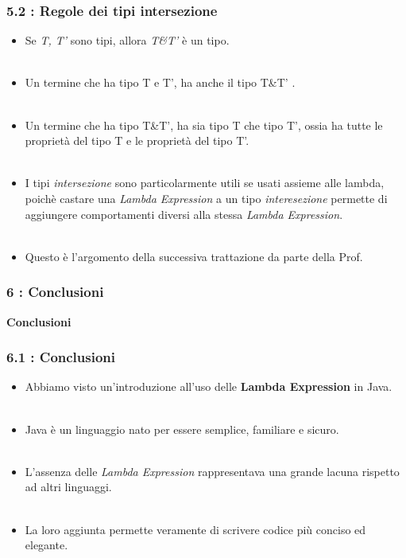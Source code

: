 \documentclass{beamer}
\begin{document}

\begin{frame}
	\frametitle{\textbf{5.2 : Regole dei tipi intersezione}}
		\begin{itemize}
		\item
			Se \textit{T, T'} sono tipi, allora \textit{T\&T'} è un tipo.\\\
		\item
			Un termine che ha tipo T e T', ha anche il tipo T\&T' .\\\
		\item
			Un termine che ha tipo T\&T', ha sia tipo T che tipo T', ossia ha tutte le proprietà del tipo T e le proprietà del tipo T'.\\\
		\item
			I tipi \textit{intersezione} sono particolarmente utili se usati assieme alle lambda, poichè castare una \textit{Lambda Expression} a un tipo \textit{interesezione} permette di aggiungere comportamenti diversi alla stessa \textit{Lambda Expression}.\\\
		\item
			Questo è l'argomento della successiva trattazione da parte della Prof.
	\end{itemize}
\end{frame}


\begin{frame}
	\frametitle{\textbf{6 : Conclusioni}}
	\begin{center}
		\textbf{\Huge Conclusioni}
	\end{center}
\end{frame}


\begin{frame}
	\frametitle{\textbf{6.1 : Conclusioni}}
	\begin{itemize}
		\item
			Abbiamo visto un'introduzione all'uso delle \textbf{Lambda Expression} in Java.\\\
		\item
			Java è un linguaggio nato per essere semplice, familiare e sicuro.\\\
		\item
			L'assenza delle \textit{Lambda Expression} rappresentava una grande lacuna rispetto ad altri linguaggi.\\\
		\item
			La loro aggiunta permette veramente di scrivere codice più conciso ed elegante.
	\end{itemize}
\end{frame}
\end{document}
